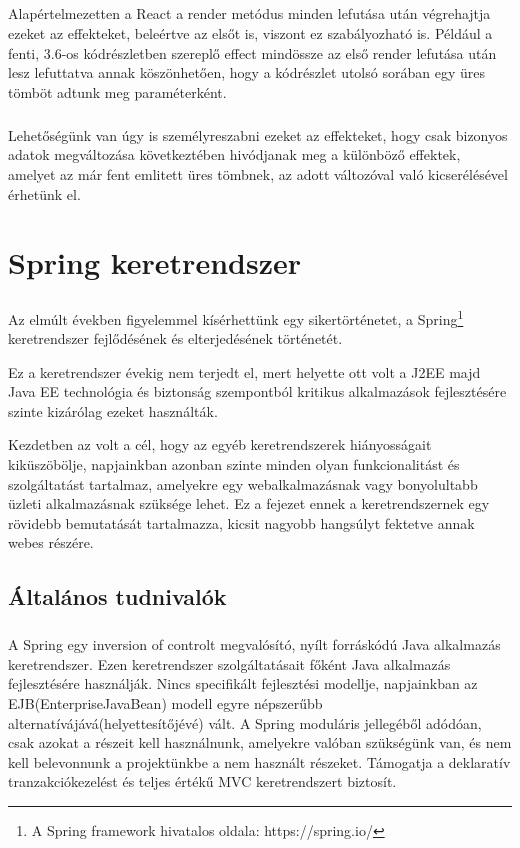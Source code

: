 \paragraph{}
Alapértelmezetten a React a render metódus minden lefutása után végrehajtja ezeket az effekteket, beleértve az elsőt is, viszont ez szabályozható is. Például a fenti, 3.6-os kódrészletben szereplő effect mindössze az első render lefutása után lesz lefuttatva annak köszönhetően, hogy a kódrészlet utolsó sorában egy üres tömböt adtunk meg paraméterként.

\paragraph{}
Lehetőségünk van úgy is személyreszabni ezeket az effekteket, hogy csak bizonyos adatok megváltozása következtében hivódjanak meg a különböző effektek, amelyet az már fent emlitett üres tömbnek, az adott változóval való kicserélésével érhetünk el.

\chapter{Spring keretrendszer}\label{ch:progik}
\paragraph{}
Az elmúlt években figyelemmel kísérhettünk egy sikertörténetet, a Spring\footnote{A Spring framework hivatalos oldala: https://spring.io/} keretrendszer fejlődésének és elterjedésének történetét. 

Ez a keretrendszer évekig nem terjedt el, mert helyette ott volt a J2EE majd Java EE technológia és biztonság szempontból kritikus alkalmazások fejlesztésére szinte kizárólag ezeket használták. 

Kezdetben az volt a cél, hogy az egyéb keretrendszerek hiányosságait kiküszöbölje, napjainkban azonban szinte minden olyan funkcionalitást és szolgáltatást tartalmaz, amelyekre egy webalkalmazásnak vagy bonyolultabb üzleti alkalmazásnak szüksége lehet. Ez a fejezet ennek a keretrendszernek egy rövidebb bemutatását tartalmazza, kicsit nagyobb hangsúlyt fektetve annak webes részére.

\section{Általános tudnivalók}
\paragraph{}
A Spring egy inversion of controlt megvalósító, nyílt forráskódú Java alkalmazás keretrendszer. Ezen keretrendszer szolgáltatásait főként Java alkalmazás fejlesztésére használják. Nincs specifikált fejlesztési modellje, napjainkban az EJB(EnterpriseJavaBean) modell egyre népszerűbb alternatívájává(helyettesítőjévé) vált. A Spring moduláris jellegéből adódóan, csak azokat a részeit kell használnunk, amelyekre valóban szükségünk van, és nem kell belevonnunk a projektünkbe a nem használt részeket. Támogatja a deklaratív tranzakciókezelést és teljes értékű MVC keretrendszert biztosít.

